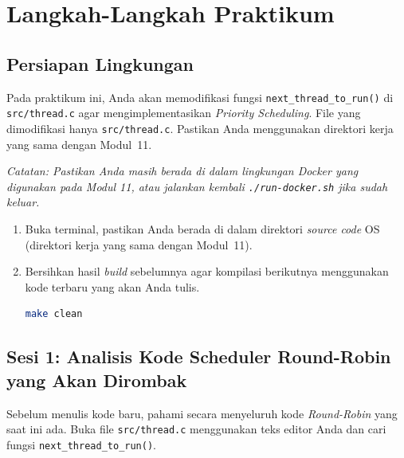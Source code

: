 \newpage
\section{Langkah-Langkah Praktikum}

\subsection{Persiapan Lingkungan}
\label{sec:m12-persiapan}

Pada praktikum ini, Anda akan memodifikasi fungsi \texttt{next\_thread\_to\_run()} di \texttt{src/thread.c} agar mengimplementasikan \textit{Priority Scheduling}. File yang dimodifikasi hanya \texttt{src/thread.c}. Pastikan Anda menggunakan direktori kerja yang sama dengan Modul~11.

\textit{Catatan: Pastikan Anda masih berada di dalam lingkungan Docker yang digunakan pada Modul 11, atau jalankan kembali \texttt{./run-docker.sh} jika sudah keluar.}

\begin{enumerate}
	\item Buka terminal, pastikan Anda berada di dalam direktori \textit{source code} OS (direktori kerja yang sama dengan Modul~11).
	\item Bersihkan hasil \textit{build} sebelumnya agar kompilasi berikutnya menggunakan kode terbaru yang akan Anda tulis.
	      \begin{lstlisting}[language=bash, caption={Bersihkan build sebelumnya}]
make clean
    \end{lstlisting}
\end{enumerate}

\subsection{Sesi 1: Analisis Kode Scheduler Round-Robin yang Akan Dirombak}
\label{sec:m12-sesi-1}

Sebelum menulis kode baru, pahami secara menyeluruh kode \textit{Round-Robin} yang saat ini ada. Buka file \texttt{src/thread.c} menggunakan teks editor Anda dan cari fungsi \texttt{next\_thread\_to\_run()}.

